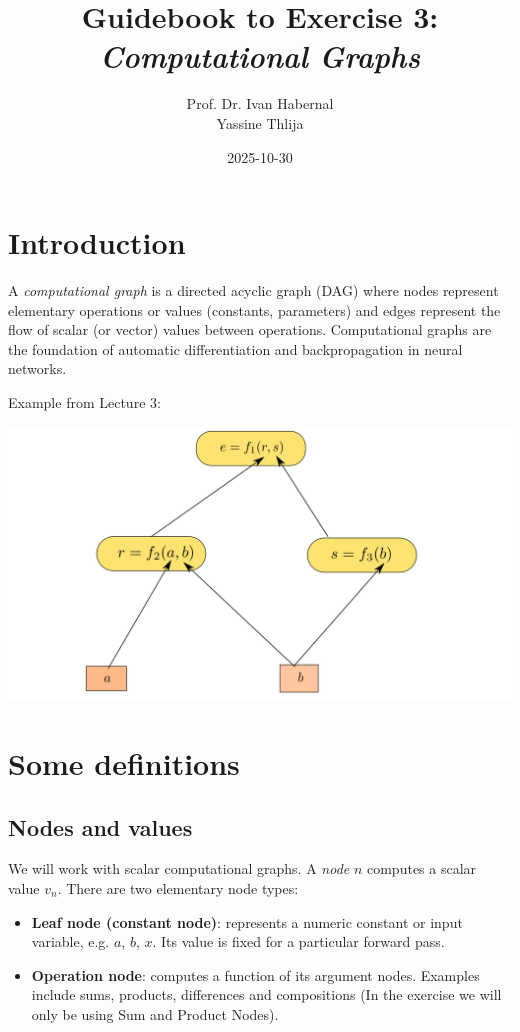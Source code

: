 \documentclass[12pt,a4paper]{article}
\title{Guidebook to Exercise 3: \textit{Computational Graphs}}
\author{Prof. Dr. Ivan Habernal \\ Yassine Thlija}
\date{2025-10-30}
\begin{document}
\maketitle

\section{Introduction}
A \emph{computational graph} is a directed acyclic graph (DAG) where nodes represent elementary operations or values (constants, parameters) and edges represent the flow of scalar (or vector) values between operations. Computational graphs are the foundation of automatic differentiation and backpropagation in neural networks.

Example from Lecture 3:

\begin{center}
\includegraphics[scale=0.2]{compu_graph_lect3_mod.png}
\end{center}

\section{Some definitions}
\subsection{Nodes and values}
We will work with scalar computational graphs. A \emph{node} $n$ computes a scalar value $v_n$. There are two elementary node types:
\begin{itemize}
    \item \textbf{Leaf node (constant node)}: represents a numeric constant or input variable, e.g. $a$, $b$, $x$. Its value is fixed for a particular forward pass.
    \item \textbf{Operation node}: computes a function of its argument nodes. Examples include sums, products, differences and compositions (In the exercise we will only be using Sum and Product Nodes).
\end{itemize}
\end{document}
